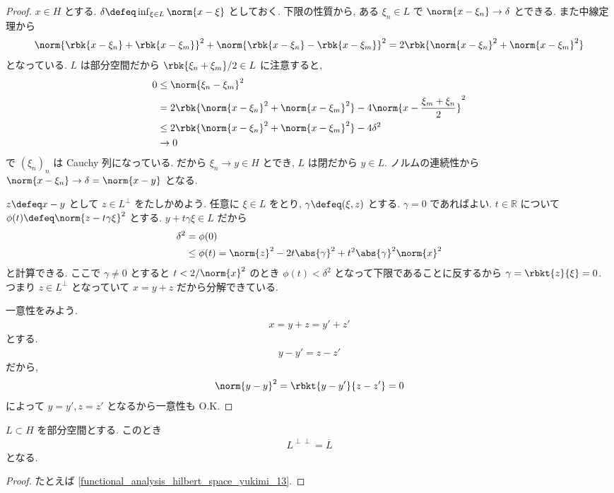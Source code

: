 \documentclass[openany, a4paper, oneside]{jsbook}
\begin{document}
\begin{proof}
$x \in H$ とする.
$\delta \defeq \inf_{\xi \in L} \norm{x - \xi}$ としておく.
下限の性質から, ある $\xi_n \in L$ で
$\norm{x - \xi_n} \to \delta$ とできる.
また中線定理から
\begin{align}
 \norm{\rbk{x - \xi_n} + \rbk{x - \xi_m}}^2 + \norm{\rbk{x - \xi_n} - \rbk{x - \xi_m}}^2
 =
  2 \rbk{\norm{x - \xi_n}^2 + \norm{x - \xi_m}^2}
\end{align}
となっている.
$L$ は部分空間だから $\rbk{\xi_n + \xi_m} / 2 \in L$ に注意すると,
\begin{align}
 0
 &\le
 \norm{\xi_n - \xi_m}^2 \\
 &=
 2 \rbk{\norm{x - \xi_n}^2 + \norm{x - \xi_m}^2}
  -4 \norm{x - \frac{\xi_m + \xi_n}{2}}^2 \\
 &\le
 2 \rbk{\norm{x - \xi_n}^2 + \norm{x - \xi_m}^2} - 4 \delta^2 \\
 &\to 0
\end{align}
で $(\xi_n)_n$ は Cauchy 列になっている.
だから $\xi_n \to y \in H$ とでき, $L$ は閉だから $y \in L$.
ノルムの連続性から $\norm{x - \xi_n} \to \delta = \norm{x - y}$ となる.

$z \defeq x-y$ として $z \in L^{\perp}$ をたしかめよう.
任意に $\xi \in L$ をとり, $\gamma \defeq (\xi, z)$ とする.
$\gamma = 0$ であればよい.
$t \in \mathbb{R}$ について $\phi(t) \defeq \norm{z - t \gamma \xi}^2$ とする.
$y + t \gamma \xi \in L$ だから
\begin{align}
 \delta^2
 &=
  \phi(0) \\
 &\le
  \phi(t)
 =
 \norm{z}^2 - 2 t \abs{\gamma}^2 + t^2 \abs{\gamma}^2 \norm{x}^2
\end{align}
と計算できる.
ここで $\gamma \neq 0$ とすると $t < 2 / \norm{x}^2$ のとき
$\phi(t) < \delta^2$ となって下限であることに反するから $\gamma = \rbkt{z}{\xi} = 0$.
つまり $z \in L^{\perp}$ となっていて $x = y + z$ だから分解できている.

一意性をみよう.
\begin{align}
 x
 =
 y + z
 =
 y' + z'
\end{align}
とする.
\begin{align}
 y - y'
 =
 z - z'
\end{align}
だから,
\begin{align}
 \norm{y - y}^2
 =
 \rbkt{y - y'}{z - z'}
 =
 0
\end{align}
によって $y=y', z=z'$ となるから一意性も O.K.
\end{proof}

\begin{cor}
 $L \subset H$ を部分空間とする.
 このとき
 \begin{align}
   L^{\perp \perp} = \overline{L}
 \end{align}
 となる.
\end{cor}
\begin{proof}
たとえば \ref{functional_analysis_hilbert_space_yukimi_13}.
\end{proof}
\end{document}
